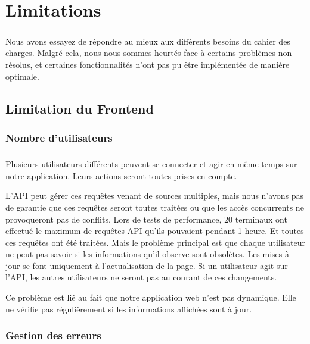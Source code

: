\chapter{Limitations}

\paragraph{}Nous avons essayez de répondre au mieux aux différents besoins du cahier des charges. Malgré cela, nous nous sommes heurtés face à certains problèmes non résolus, et certaines fonctionnalités n'ont pas pu être implémentée de manière optimale.

\section{Limitation du Frontend}

\subsection{Nombre d'utilisateurs}%
\paragraph{}

Plusieurs utilisateurs différents peuvent se connecter et agir en même temps sur notre application. Leurs actions seront toutes prises en compte.

L'API peut gérer ces requêtes venant de sources multiples, mais nous n'avons pas de garantie que ces requêtes seront toutes traitées ou que les accès concurrents ne provoqueront pas de conflits.
Lors de tests de performance, 20 terminaux ont effectué le maximum de requêtes API qu'ils pouvaient pendant 1 heure. Et toutes ces requêtes ont été traitées.
Mais le problème principal est que chaque utilisateur ne peut pas savoir si les informations qu'il observe sont obsolètes. Les mises à jour se font uniquement à l'actualisation de la page.
Si un utilisateur agit sur l'API, les autres utilisateurs ne seront pas au courant de ces changements.

Ce problème est lié au fait que notre application web n'est pas dynamique.\newline
Elle ne vérifie pas régulièrement si les informations affichées sont à jour.


\subsection{Gestion des erreurs}
